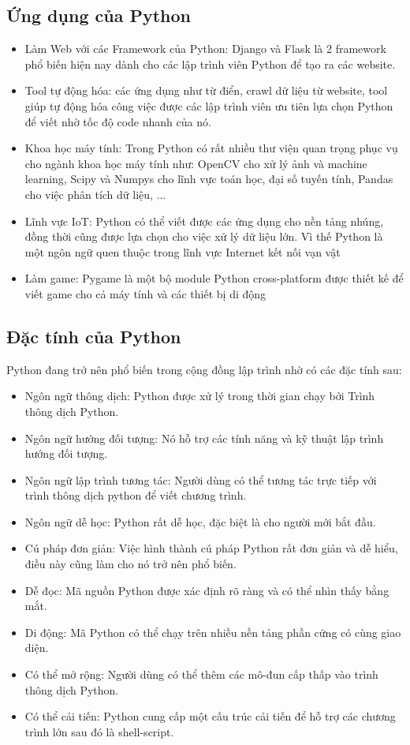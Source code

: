\documentclass[a4paper]{article}
\begin{document}
\subsection{Ứng dụng của Python}
\begin{itemize}
    \item Làm Web với các Framework của Python: Django và Flask là 2 framework phổ biến hiện nay dành cho các lập trình viên Python để tạo ra các website.
    \item Tool tự động hóa: các ứng dụng như từ điển, crawl dữ liệu từ website, tool giúp tự động hóa công việc được các lập trình viên ưu tiên lựa chọn Python để viết nhờ tốc độ code nhanh của nó.
    \item Khoa học máy tính: Trong Python có rất nhiều thư viện quan trọng phục vụ cho ngành khoa học máy tính như: OpenCV cho xử lý ảnh và machine learning, Scipy và Numpys cho lĩnh vực toán học, đại số tuyến tính, Pandas cho việc phân tích dữ liệu, ...
    \item Lĩnh vực IoT: Python có thể viết được các ứng dụng cho nền tảng nhúng, đồng thời cũng được lựa chọn cho việc xử lý dữ liệu lớn. Vì thế Python là một ngôn ngữ quen thuộc trong lĩnh vực Internet kết nối vạn vật
    \item Làm game: Pygame là một bộ module Python cross-platform được thiết kế để viết game cho cả máy tính và các thiết bị di động
\end{itemize}

\subsection{Đặc tính của Python}
Python đang trở nên phổ biến trong cộng đồng lập trình nhờ có các đặc tính sau:
\begin{itemize}
    \item Ngôn ngữ thông dịch: Python được xử lý trong thời gian chạy bởi Trình thông dịch Python.
    \item Ngôn ngữ hướng đối tượng: Nó hỗ trợ các tính năng và kỹ thuật lập trình hướng đối tượng.
    \item Ngôn ngữ lập trình tương tác: Người dùng có thể tương tác trực tiếp với trình thông dịch python để viết chương trình.
    \item Ngôn ngữ dễ học: Python rất dễ học, đặc biệt là cho người mới bắt đầu.
    \item Cú pháp đơn giản: Việc hình thành cú pháp Python rất đơn giản và dễ hiểu, điều này cũng làm cho nó trở nên phổ biến.
    \item Dễ đọc: Mã nguồn Python được xác định rõ ràng và có thể nhìn thấy bằng mắt.
    \item Di động: Mã Python có thể chạy trên nhiều nền tảng phần cứng có cùng giao diện.
    \item Có thể mở rộng: Người dùng có thể thêm các mô-đun cấp thấp vào trình thông dịch Python.
    \item Có thể cải tiến: Python cung cấp một cấu trúc cải tiến để hỗ trợ các chương trình lớn sau đó là shell-script.
\end{itemize}
\end{document}
